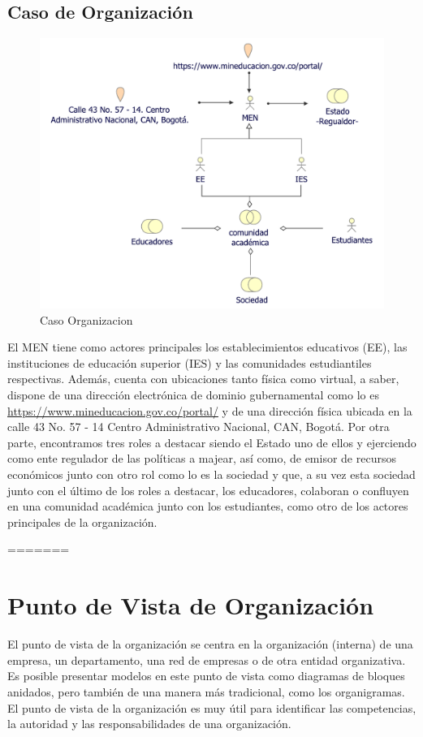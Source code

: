 \newpage
\subsection{Caso  de Organización}
\begin{figure}[h!]
	\centering
	\includegraphics[width=.9\linewidth]{imgs/caso/negocio/organizacion}
	\caption{Caso Organizacion}
\end{figure}

El MEN tiene como actores principales los establecimientos educativos (EE), las instituciones de educación superior (IES) y las comunidades estudiantiles respectivas. Además, cuenta con ubicaciones tanto física como virtual, a saber, dispone de una dirección electrónica de dominio gubernamental como lo es \url{https://www.mineducacion.gov.co/portal/} y de una dirección física ubicada en la calle 43 No. 57 - 14 Centro 
Administrativo Nacional, CAN, Bogotá. Por otra parte, encontramos tres roles a destacar siendo el Estado uno de ellos y ejerciendo como ente regulador de las políticas a majear, así como, de emisor de recursos económicos junto con otro rol como lo es la sociedad y que, a su vez esta sociedad junto con el último de los roles a destacar, los educadores, colaboran o confluyen en una comunidad académica junto con los estudiantes, como otro de los actores principales de la organización.

=======
\section{Punto de Vista de Organización}

El punto de vista de la organización se centra en la organización (interna) de una empresa, un departamento, una red de empresas o de otra entidad organizativa. Es posible presentar modelos en este punto de vista como diagramas de bloques anidados, pero también de una manera más tradicional, como los organigramas. El punto de vista de la organización es muy útil para identificar las competencias, la autoridad y las responsabilidades de una organización.

